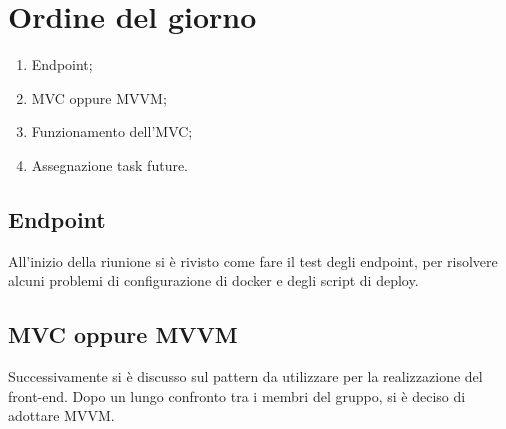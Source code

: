 \section{Ordine del giorno}
\begin{enumerate}
\item Endpoint;
\item MVC oppure MVVM;
\item Funzionamento dell'MVC;
\item Assegnazione task future.
\end{enumerate}

\subsection{Endpoint}
All'inizio della riunione si è rivisto come fare il test degli endpoint, per risolvere alcuni problemi di configurazione di docker e degli script di deploy.\\

\subsection{MVC oppure MVVM}
Successivamente si è discusso sul pattern da utilizzare per la realizzazione del front-end. Dopo un lungo confronto tra i membri del gruppo, si è deciso di adottare MVVM.

